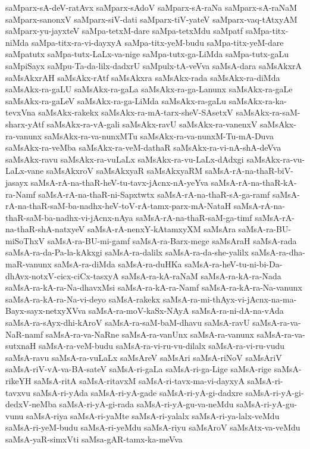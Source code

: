 {saMparx-sA-deV-ratAvx
saMparx-sAdoV
saMparx-sA-raNa
saMparx-sA-raNaM
saMparx-sanonxV
saMparx-siV-dati
saMparx-tiV-yateV
saMparx-vaq-tAtxyAM
saMparx-yu-jayxteV
saMpa-tetxM-dare
saMpa-tetxMdu
saMpatf
saMpa-titx-niMda
saMpa-titx-ra-vi-dayxyA
saMpa-titx-yeM-budu
saMpa-titx-yeM-dare
saMpatutx
saMpa-tutx-LaLx-va-nige
saMpa-tutx-ga-LiMda
saMpa-tutx-gaLu
saMpiSayx
saMpu-Ta-da-lilx-dadxrU
saMpulx-tA-veVva
saMsA-dara
saMsAkxrA
saMsAkxrAH
saMsAkx-rAtf
saMsAkxra
saMsAkx-rada
saMsAkx-ra-diMda
saMsAkx-ra-gaLU
saMsAkx-ra-gaLa
saMsAkx-ra-ga-Lanunx
saMsAkx-ra-gaLe
saMsAkx-ra-gaLeV
saMsAkx-ra-ga-LiMda
saMsAkx-ra-gaLu
saMsAkx-ra-ka-tevxVna
saMsAkx-rakekx
saMsAkx-ra-mA-tarx-sheV-SAsetxV
saMsAkx-ra-saM-sharx-yAtf
saMsAkx-ra-vA-gali
saMsAkx-ravU
saMsAkx-ra-vanenxV
saMsAkx-ra-vanunx
saMsAkx-ra-va-nunxMTu
saMsAkx-ra-va-nunxM-Tu-mA-Duva
saMsAkx-ra-veMba
saMsAkx-ra-veM-dathaR
saMsAkx-ra-vi-nA-shA-deVva
saMsAkx-ravu
saMsAkx-ra-vuLaLx
saMsAkx-ra-vu-LaLx-dAdxgi
saMsAkx-ra-vu-LaLx-vane
saMsAkxroV
saMsAkxyaR
saMsAkxyaRM
saMsA-rA-na-thaR-biV-jasayx
saMsA-rA-na-thaR-heV-tu-tavx-jAcnx-nA-yeYva
saMsA-rA-na-thaR-kA-ra-Namf
saMsA-rA-na-thaR-ni-Sapxtwtx
saMsA-rA-na-thaR-sA-ga-ramf
saMsA-rA-na-thaR-saM-ba-nadhx-heV-toV-rA-tamx-parx-mA-NataH
saMsA-rA-na-thaR-saM-ba-nadhx-vi-jAcnx-nAya
saMsA-rA-na-thaR-saM-ga-timf
saMsA-rA-na-thaR-shA-natxyeV
saMsA-rA-nenxY-kAtamxyXM
saMsAra
saMsA-ra-BU-miSoThxV
saMsA-ra-BU-mi-gamf
saMsA-ra-Barx-mege
saMsAraH
saMsA-rada
saMsA-ra-da-Pa-la-kAkxgi
saMsA-ra-dalilx
saMsA-ra-da-she-yalilx
saMsA-ra-dha-maR-vanunx
saMsA-ra-diMda
saMsA-ra-duHKa
saMsA-ra-heV-tu-ni-bi-Da-dhAvx-notxV-cicx-ciCx-tasxyA
saMsA-ra-kA-raNaM
saMsA-ra-kA-ra-Nada
saMsA-ra-kA-ra-Na-dhavxMsi
saMsA-ra-kA-ra-Namf
saMsA-ra-kA-ra-Na-vanunx
saMsA-ra-kA-ra-Na-vi-deyo
saMsA-rakekx
saMsA-ra-mi-thAyx-vi-jAcnx-na-ma-Bayx-sayx-netxyXVva
saMsA-ra-moV-kaSx-NAyA
saMsA-ra-ni-dA-na-vAda
saMsA-ra-sAyx-dhi-kAroV
saMsA-ra-saM-baM-dhavu
saMsA-ravU
saMsA-ra-va-NaR-namf
saMsA-ra-va-NaRne
saMsA-ra-vanUnx
saMsA-ra-vanunx
saMsA-ra-va-sutxnaH
saMsA-ra-veM-budu
saMsA-ra-vi-ru-vu-dilalx
saMsA-ra-vi-ru-vudu
saMsA-ravu
saMsA-ra-vuLaLx
saMsAreV
saMsAri
saMsA-riNoV
saMsAriV
saMsA-riV-vA-va-BA-sateV
saMsA-ri-gaLa
saMsA-ri-ga-Lige
saMsA-rige
saMsA-rikeYH
saMsA-ritA
saMsA-ritavxM
saMsA-ri-tavx-ma-vi-dayxyA
saMsA-ri-tavxvu
saMsA-ri-yAda
saMsA-ri-yA-gade
saMsA-ri-yA-gi-dadxre
saMsA-ri-yA-gi-dedxV-neMba
saMsA-ri-yA-gi-rada
saMsA-ri-yA-gu-va-neMdu
saMsA-ri-yA-gu-vunu
saMsA-riya
saMsA-ri-yaMte
saMsA-ri-yalalx
saMsA-ri-ya-lalx-veMdu
saMsA-ri-yeM-budu
saMsA-ri-yeMdu
saMsA-riyu
saMsAroV
saMsAtx-va-veMdu
saMsA-yaR-simxVti
saMsa-gAR-tamx-ka-meVva
}

